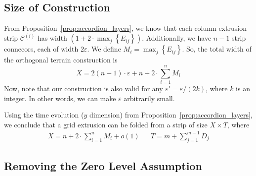 \subsection{Size of Construction}
\label{sec:size}

From Proposition~\ref{prop:accordion_layers}, we know that each column extrusion strip
$\mathcal C^{(i)}$ has width $\left( 1 + 2\cdot\max_j\left\{ E_{ij}\right\}\right)$.
Additionally, we have $n-1$ strip connecors, each of width $2\varepsilon$.
We define $M_i = \max_j\left\{ E_{ij}\right\}$. So, the total width of the orthogonal terrain construction is
$$X = 2(n-1)\cdot\varepsilon + n + 2\cdot\sum\limits_{i=1}^n M_i$$
Now, note that our construction is also valid for any $\varepsilon' = \varepsilon/(2k)$, where $k$ is an integer.
In other words, we can make $\varepsilon$ arbitrarily small.

\begin{theorem}
\label{thm:grid_extrusion}
Using the time evolution ($y$ dimension) from Proposition~\ref{prop:accordion_layers},
we conclude that a grid extrusion can be folded from a strip of size $X\times T$, where
\begin{align}
X = n + 2\cdot\sum\limits_{i=1}^n M_i + o(1) && T = m + \sum\limits^{m-1}_{j=1} D_j
\end{align}
\end{theorem}

\subsection{Removing the Zero Level Assumption}
\label{sec:zero_level_assumption}

